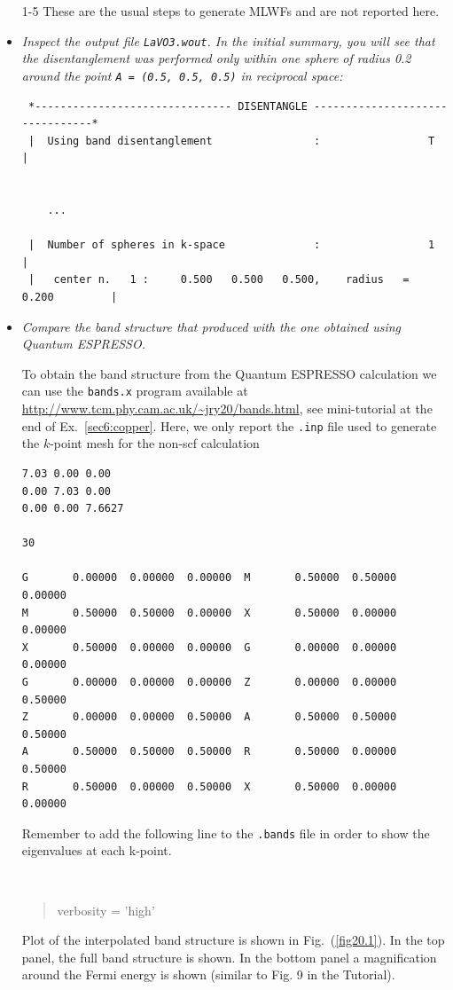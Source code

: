\begin{itemize}
	\item [1-5] These are the usual steps to generate MLWFs and are not reported here.

	\item {\it Inspect the output file {\tt LaVO3.wout}. In the initial summary, you will see that the disentanglement was
performed only within one sphere of radius 0.2 around the point {\tt A = (0.5, 0.5, 0.5)} in reciprocal space:}

{\small
\begin{tcolorbox}[sharp corners,boxrule=0.5pt]
\begin{verbatim}
 *------------------------------- DISENTANGLE --------------------------------*
 |  Using band disentanglement                :                 T             |


 	...

 |  Number of spheres in k-space              :                 1             |
 |   center n.   1 :     0.500   0.500   0.500,    radius   =   0.200         |
\end{verbatim}
\end{tcolorbox}
}

\item {\it Compare the band structure that \Wannier{} produced with the one obtained using Quantum ESPRESSO.}

To obtain the band structure from the Quantum ESPRESSO calculation we can use the {\tt bands.x} program available at \url{http://www.tcm.phy.cam.ac.uk/~jry20/bands.html}, see mini-tutorial at the end of Ex.~\ref{sec6:copper}. Here, we only report the {\tt .inp} file used to generate the $k$-point mesh for the non-scf calculation
{\small
\begin{tcolorbox}[title=bands.x input file LaVO3.inp,sharp corners,boxrule=0.5pt]
\begin{verbatim}
7.03 0.00 0.00
0.00 7.03 0.00
0.00 0.00 7.6627

30

G       0.00000  0.00000  0.00000  M       0.50000  0.50000  0.00000
M       0.50000  0.50000  0.00000  X       0.50000  0.00000  0.00000
X       0.50000  0.00000  0.00000  G       0.00000  0.00000  0.00000
G       0.00000  0.00000  0.00000  Z       0.00000  0.00000  0.50000
Z       0.00000  0.00000  0.50000  A       0.50000  0.50000  0.50000
A       0.50000  0.50000  0.50000  R       0.50000  0.00000  0.50000
R       0.50000  0.00000  0.50000  X       0.50000  0.00000  0.00000
\end{verbatim}
\end{tcolorbox}
}
Remember to add the following line to the {\tt .bands} file in order to show the eigenvalues at each k-point.
{\tt
\begin{quote}
verbosity      = 'high'
\end{quote}
}
Plot of the interpolated band structure is shown in Fig.~(\ref{fig20.1}). In the top panel, the full band structure is shown. In the bottom panel a magnification around the Fermi energy is shown (similar to Fig. 9 in the Tutorial).
\end{itemize}

